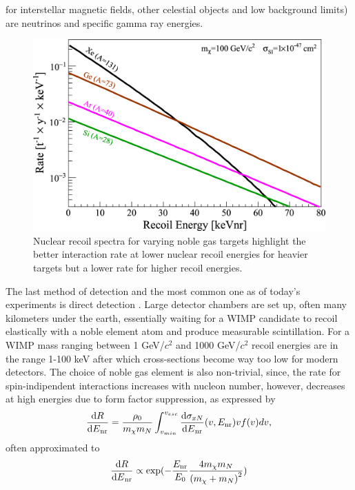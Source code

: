 \documentclass[11pt]{article} %
\begin{document}
for interstellar magnetic fields, other celestial objects and low background limits) are neutrinos and specific gamma ray energies.
\\
\begin{figure}[H]
\centering
\includegraphics[scale=1]{images/recoil_spectra.jpg}
\caption{\cite{Schumann_2019} Nuclear recoil spectra for varying noble gas targets highlight the better interaction
rate at lower nuclear recoil energies for heavier targets but a lower rate for higher recoil energies.}
\label{fig:recoil_spectra}
\end{figure}
\par The last method of detection and the most common one as of today's experiments is direct detection \cite{gaitskell2004direct}.
Large detector chambers are set up, often many kilometers under the earth, essentially waiting for a WIMP
candidate to recoil elastically with a noble element atom and produce measurable scintillation.
For a WIMP mass ranging between 1 GeV/$c^2$ and 1000 GeV/$c^2$ recoil energies are in the range 1-100 keV
after which cross-sections become way too low for modern detectors.
The choice of noble gas element is also non-trivial, since, the rate for spin-indipendent interactions increases with
nucleon number, however, decreases at high energies due to form factor suppression, as expressed by \cite{goodman1985detectability}
\begin{equation}
\frac{{\rm{d}}{R}}{{{\rm{d}}{E}}_{\mathrm{nr}}} = \frac{\rho_0}{m_{\chi} m_N} \int_{v_{min}}^{v_{esc}}\frac{{\rm{d}}{\sigma_{x N}}}{{{\rm{d}}{E}}_{\mathrm{nr}}}(v,E_{\mathrm{nr}}) v f(v) dv,
\label{eq:dm}
\end{equation}
often approximated to \cite{lewin1996review}
\begin{equation}
\frac{{\rm{d}}{R}}{{{\rm{d}}{E}}_{\mathrm{nr}}}\propto \exp (- \frac{{E}_{\mathrm{nr}}}{{E}_{0}} \frac{4{m}_{\chi }{m}_{N}}{{({m}_{\chi }+{m}_{N})}^{2}})
\end{equation}
\end{document}
